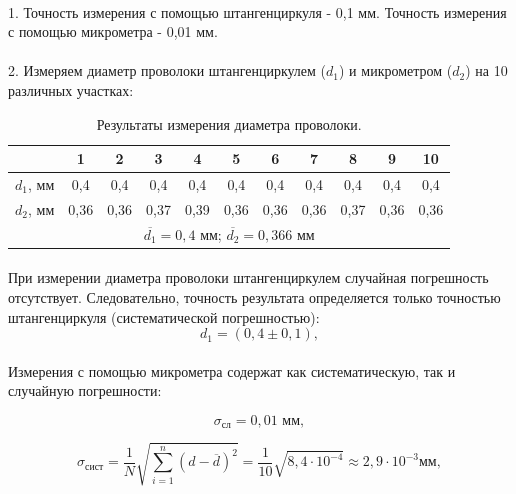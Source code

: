 \documentclass[14pt, a4paper]{scrartcl}
\begin{document}
\paragraph{}
1. Точность измерения с помощью штангенциркуля - 0,1 мм. Точность измерения с помощью микрометра - 0,01 мм.
\paragraph{}
2. Измеряем диаметр проволоки штангенциркулем ($d_1$) и микрометром ($d_2$) на 10 различных участках:

\begin{table}[H]
\caption{\label{tab:diametr}Результаты измерения диаметра проволоки.}
\begin{center}
\begin{tabular}{|c|c|c|c|c|c|c|c|c|c|c|}
\hline
& 1 & 2 & 3 & 4 & 5 & 6 & 7 & 8 & 9 & 10 \\
\hline
$d_1$, мм & 0,4 & 0,4 & 0,4 & 0,4 & 0,4 & 0,4 & 0,4 & 0,4 & 0,4 & 0,4  \\
\hline
$d_2$, мм & 0,36 & 0,36 & 0,37 & 0,39 & 0,36 & 0,36 & 0,36 & 0,37 & 0,36 & 0,36  \\
\hline
\multicolumn{11}{|c|}{$\overline{d_1} = 0,4$ мм; $\overline{d_2} =  0,366$ мм} \\
\hline
\end{tabular}
\end{center}
\end{table} 
\paragraph{}
При измерении диаметра проволоки штангенциркулем случайная погрешность отсутствует. Следовательно, точность результата определяется только точностью штангенциркуля (систематической погрешностью):
\begin{equation}\label{eq:d1}
d_1 = (0,4 \pm 0,1), 
\end{equation}

\paragraph{}
Измерения с помощью микрометра содержат как систематическую, так и случайную погрешности:

\begin{equation}\label{eq:sigmasist}
\sigma_\text{сл}=0,01 \text{ мм}, 
\end{equation}

\begin{equation}\label{eq:sigmasled}
\sigma_\text{сист}=\frac1N\sqrt{\sum_{i=1}^n (d-\overline{d})^2}=\frac{1}{10}\sqrt{8,4\cdot10^{-4}}\approx2,9\cdot10^{-3} \text{мм},
\end{equation}
\end{document}

